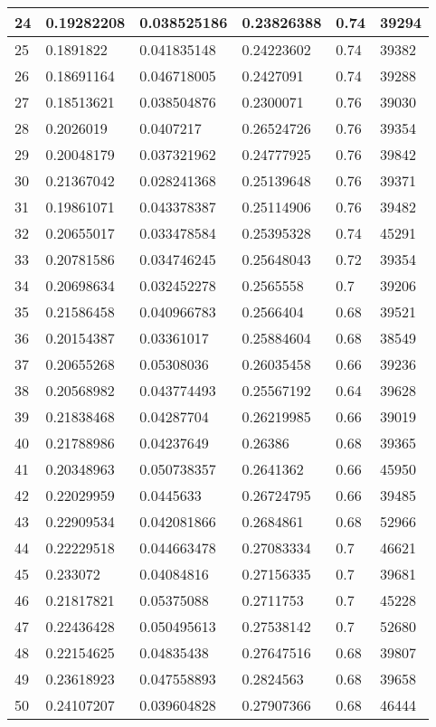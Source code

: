 \begin{longtable}{|l|l|l|l|l|l|}
24 & 0.19282208 & 0.038525186 & 0.23826388 & 0.74 & 39294 \\ \hline 
25 & 0.1891822 & 0.041835148 & 0.24223602 & 0.74 & 39382 \\ \hline 
26 & 0.18691164 & 0.046718005 & 0.2427091 & 0.74 & 39288 \\ \hline 
27 & 0.18513621 & 0.038504876 & 0.2300071 & 0.76 & 39030 \\ \hline 
28 & 0.2026019 & 0.0407217 & 0.26524726 & 0.76 & 39354 \\ \hline 
29 & 0.20048179 & 0.037321962 & 0.24777925 & 0.76 & 39842 \\ \hline 
30 & 0.21367042 & 0.028241368 & 0.25139648 & 0.76 & 39371 \\ \hline 
31 & 0.19861071 & 0.043378387 & 0.25114906 & 0.76 & 39482 \\ \hline 
32 & 0.20655017 & 0.033478584 & 0.25395328 & 0.74 & 45291 \\ \hline 
33 & 0.20781586 & 0.034746245 & 0.25648043 & 0.72 & 39354 \\ \hline 
34 & 0.20698634 & 0.032452278 & 0.2565558 & 0.7 & 39206 \\ \hline 
35 & 0.21586458 & 0.040966783 & 0.2566404 & 0.68 & 39521 \\ \hline 
36 & 0.20154387 & 0.03361017 & 0.25884604 & 0.68 & 38549 \\ \hline 
37 & 0.20655268 & 0.05308036 & 0.26035458 & 0.66 & 39236 \\ \hline 
38 & 0.20568982 & 0.043774493 & 0.25567192 & 0.64 & 39628 \\ \hline 
39 & 0.21838468 & 0.04287704 & 0.26219985 & 0.66 & 39019 \\ \hline 
40 & 0.21788986 & 0.04237649 & 0.26386 & 0.68 & 39365 \\ \hline 
41 & 0.20348963 & 0.050738357 & 0.2641362 & 0.66 & 45950 \\ \hline 
42 & 0.22029959 & 0.0445633 & 0.26724795 & 0.66 & 39485 \\ \hline 
43 & 0.22909534 & 0.042081866 & 0.2684861 & 0.68 & 52966 \\ \hline 
44 & 0.22229518 & 0.044663478 & 0.27083334 & 0.7 & 46621 \\ \hline 
45 & 0.233072 & 0.04084816 & 0.27156335 & 0.7 & 39681 \\ \hline 
46 & 0.21817821 & 0.05375088 & 0.2711753 & 0.7 & 45228 \\ \hline 
47 & 0.22436428 & 0.050495613 & 0.27538142 & 0.7 & 52680 \\ \hline 
48 & 0.22154625 & 0.04835438 & 0.27647516 & 0.68 & 39807 \\ \hline 
49 & 0.23618923 & 0.047558893 & 0.2824563 & 0.68 & 39658 \\ \hline 
50 & 0.24107207 & 0.039604828 & 0.27907366 & 0.68 & 46444 \\ \hline 
\end{longtable}